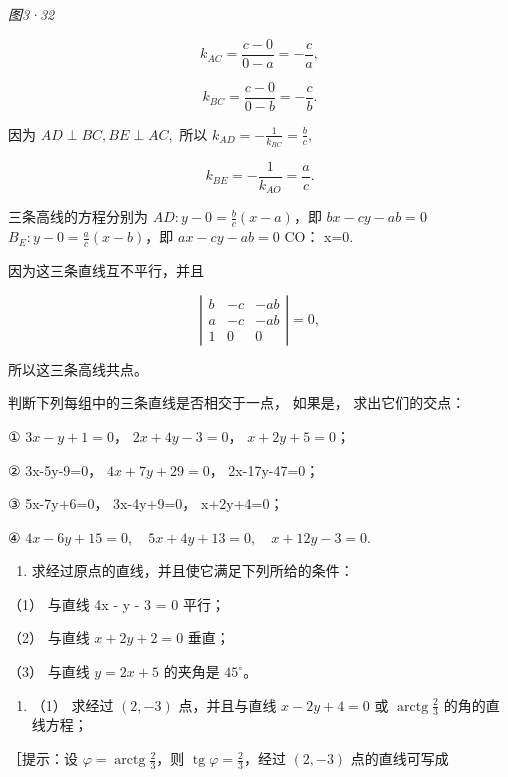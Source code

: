 \emph{图3·32}

\[
k_{AC} = \frac {c - 0}{0 - a} = - \frac {c}{a},
\]

\[
k_{BC} = \frac {c - 0}{0 - b} = - \frac {c}{b}.
\]

因为 \(AD \perp BC, BE \perp AC,\) 所以
\(k_{AD} = -\frac{1}{k_{BC}} = \frac{b}{c},\)

\[
k_{BE} = - \frac {1}{k_{AO}} = \frac {a}{c}.
\]

三条高线的方程分别为 \(AD: y - 0 = \frac{b}{c} (x - a)\)，即
\(bx - cy - ab = 0\) \(B_{E}: y - 0 = \frac{a}{c} (x - b)\)，即
\(ax - cy - ab = 0\) CO： x=0.

因为这三条直线互不平行，并且

\[
\left| \begin{array}{ccc} b & - c & - a b \\ a & - c & - a b \\ 1 & 0 & 0 \end{array} \right| = 0,
\]

所以这三条高线共点。

判断下列每组中的三条直线是否相交于一点， 如果是， 求出它们的交点：

① \(3x - y + 1 = 0\)， \(2x + 4y - 3 = 0\)， \(x + 2y + 5 = 0\)；

② 3x-5y-9=0， \(4x+7y+29=0\)， 2x-17y-47=0；

③ 5x-7y+6=0， 3x-4y+9=0， x+2y+4=0；

④ \(4x-6y+15=0,\quad5x+4y+13=0,\quad x+12y-3=0.\)

\begin{enumerate}
\def\labelenumi{\arabic{enumi}.}
\tightlist
\item
  求经过原点的直线，并且使它满足下列所给的条件：
\end{enumerate}

（1） 与直线 4x - y - 3 = 0 平行；

（2） 与直线 \(x + 2y + 2 = 0\) 垂直；

（3） 与直线 \(y=2x+5\) 的夹角是 \(45^{\circ}\)。

\begin{enumerate}
\def\labelenumi{\arabic{enumi}.}
\setcounter{enumi}{1}
\tightlist
\item
  （1） 求经过 \((2, -3)\) 点，并且与直线 \(x - 2y + 4 = 0\) 或
  \(\operatorname{arctg} \frac{2}{3}\) 的角的直线方程；
\end{enumerate}

［提示：设 \(\varphi=\operatorname{arctg}\frac{2}{3}\)，则
\(\operatorname{tg}\varphi=\frac{2}{3}\)，经过 \((2,-3)\) 点的直线可写成

